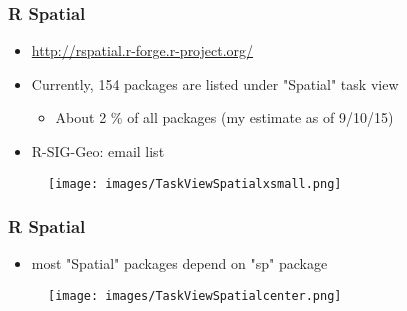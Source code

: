 \documentclass[11pt]{beamer}
\begin{document}
\begin{frame}
\frametitle{R Spatial}
\begin{itemize}
\item \href{http://rspatial.r-forge.r-project.org/}{http://rspatial.r-forge.r-project.org/}
\item Currently, 154 packages are listed under "Spatial" task view
\begin{itemize}
\item About 2 \% of all packages (my estimate as of 9/10/15)
\end{itemize}
\item R-SIG-Geo: email list
\end{itemize}
\begin{figure}
\texttt{[image: images/TaskViewSpatialxsmall.png]}
\end{figure}
\end{frame}

\begin{frame}
\frametitle{R Spatial}
\begin{itemize}
\item most "Spatial" packages depend on "sp" package
\end{itemize}
\begin{figure}
\texttt{[image: images/TaskViewSpatialcenter.png]}
\end{figure}
\end{frame}
\end{document}
